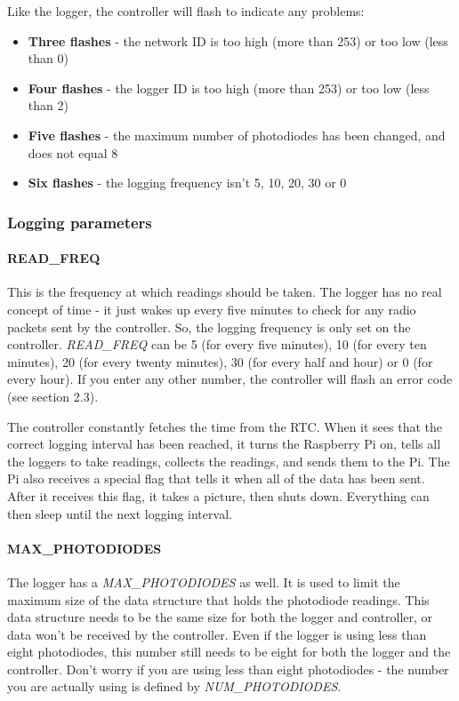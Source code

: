 \documentclass[10pt]{article}
\begin{document}
Like the logger, the controller will flash to indicate any problems:

\begin{itemize}
 \item \textbf{Three flashes}	- the network ID is too high (more than 253) or too low (less than 0)
 \item \textbf{Four flashes}	- the logger ID is too high (more than 253) or too low (less than 2)
 \item \textbf{Five flashes}	- the maximum number of photodiodes has been changed, and does not equal 8
 \item \textbf{Six flashes}	- the logging frequency isn't 5, 10, 20, 30 or 0
\end{itemize}

\subsubsection{Logging parameters}

\paragraph{READ\_FREQ}
This is the frequency at which readings should be taken. The logger has no real concept of time - it just wakes up every five minutes to check for any radio packets sent by the controller. So, the logging frequency is only set on the controller. \textit{READ\_FREQ} can be 5 (for every five minutes), 10 (for every ten minutes), 20 (for every twenty minutes), 30 (for every half and hour) or 0 (for every hour). If you enter any other number, the controller will flash an error code (see section 2.3).

The controller constantly fetches the time from the RTC. When it sees that the correct logging interval has been reached, it turns the Raspberry Pi on, tells all the loggers to take readings, collects the readings, and sends them to the Pi. The Pi also receives a special flag that tells it when all of the data has been sent. After it receives this flag, it takes a picture, then shuts down. Everything can then sleep until the next logging interval.

\paragraph{MAX\_PHOTODIODES}
The logger has a \textit{MAX\_PHOTODIODES} as well. It is used to limit the maximum size of the data structure that holds the photodiode readings. This data structure needs to be the same size for both the logger and controller, or data won't be received by the controller. Even if the logger is using less than eight photodiodes, this number still needs to be eight for both the logger and the controller. Don't worry if you are using less than eight photodiodes - the number you are actually using is defined by \textit{NUM\_PHOTODIODES}.
\end{document}
